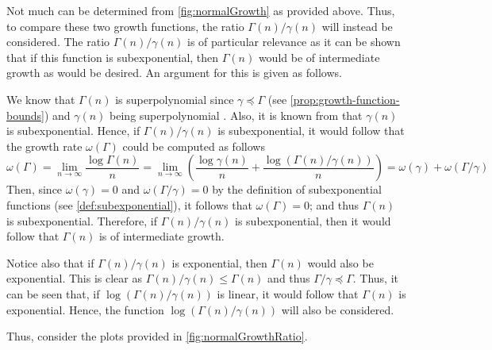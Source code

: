 Not much can be determined from \cref{fig:normalGrowth} as provided above.
Thus, to compare these two growth functions, the ratio $\Gamma(n)/\gamma(n)$ will instead be considered.
The ratio  $\Gamma(n)/\gamma(n)$ is of particular relevance as it can be shown that if this function is subexponential, then $\Gamma(n)$ would be of intermediate growth as would be desired.
An argument for this is given as follows.

We know  that $\Gamma(n)$ is superpolynomial since $\gamma \preccurlyeq \Gamma$ (see \cref{prop:growth-function-bounds}) and $\gamma(n)$ being superpolynomial \cite{OnGrowth}.
Also, it is known from \cite{OnGrowth} that $\gamma(n)$ is subexponential.
Hence, if $\Gamma(n)/\gamma(n)$ is subexponential, it would follow that the growth rate $\omega(\Gamma)$ could be computed as follows
\[
  \omega(\Gamma)
  =
  \lim_{n \to \infty}
  \frac{\log \Gamma(n)}{n}
  =
  \lim_{n \to \infty}
  \left(
  \frac{\log \gamma(n)}{n}
  +
  \frac{\log (\Gamma(n)/\gamma(n))}{n}
  \right)
  =
  \omega(\gamma)
  +
  \omega(\Gamma/\gamma)
\]
Then, since $\omega(\gamma) = 0$ and $\omega(\Gamma/\gamma) = 0$ by the definition of subexponential functions (see \cref{def:subexponential}), it follows that $\omega(\Gamma) = 0$; and thus $\Gamma(n)$ is subexponential.
Therefore, if $\Gamma(n)/\gamma(n)$ is subexponential, then it would follow that $\Gamma(n)$ is of intermediate growth.

Notice also that if $\Gamma(n)/\gamma(n)$ is exponential, then $\Gamma(n)$ would also be exponential.
This is clear as $\Gamma(n)/\gamma(n) \leq \Gamma(n)$ and thus $\Gamma/\gamma \preccurlyeq \Gamma$.
Thus, it can be seen that, if $\log(\Gamma(n)/\gamma(n))$ is linear, it would follow that $\Gamma(n)$ is exponential.
Hence, the function $\log(\Gamma(n)/\gamma(n))$ will also be considered.

Thus, consider the plots provided in \cref{fig:normalGrowthRatio}.

